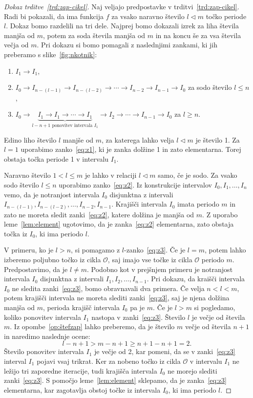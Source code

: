 \documentclass[mat2]{fmfdelo}
\begin{document}
\begin{proof}[Dokaz trditve~\ref{trd:zap-cikel}]
Naj veljajo predpostavke v trditvi~\ref{trd:zap-cikel}. Radi bi pokazali, da ima funkcija $f$ za vsako naravno število $l\triangleleft m$ točko periode $l$. Dokaz bomo razdelili na tri dele. Najprej bomo dokazali izrek za liha števila manjša od $m$, potem za soda števila manjša od $m$ in na koncu še za vsa števila večja od $m$.
Pri dokazu si bomo pomagali z naslednjimi zankami, ki jih preberamo s slike~\ref{fig:nkotnik}:
\begin{enumerate}[label={(Z\arabic*)}]
\item $I_1 \to I_1$,\label{eq:z1}
\item$I_0\to I_{n-(l-1)} \to I_{n-(l-2)} \to \cdots \to I_{n-2} \to I_{n-1} \to I_0$ za sodo število $l \leq n$,\label{eq:z2}
\item $I_0\to\underbrace{I_1 \to I_1 \to \cdots  \to I_1}_{l - n +1 \text{ ponovitev intervala } I_1} \to I_2 \to \cdots \to I_{n-1} \to I_0 $ za $l \geq n$.\label{eq:z3}
\end{enumerate}
Edino liho število $l$ manjše od $m$, za katerega lahko velja $l\triangleleft m$ je število 1. Za $l=1$ uporabimo zanko~\ref{eq:z1}, ki je zanka dolžine 1 in zato elementarna. Torej obstaja točka periode 1 v intervalu $I_1$.

Naravno število  $1<l \leq m$ je lahko v relaciji $l \triangleleft m$ samo, če je sodo. Za vsako sodo število $l \leq n$ uporabimo zanko~\ref{eq:z2}.
Iz konstrukcije intervalov $I_0, I_1, \dots, I_n$ vemo, da je notranjost intervala $I_0$ disjunktna z intervali $I_{n-(l-1)}, I_{n-(l-2)}, \dots, I_{n-2}, I_{n-1}$. Krajišči intervala $I_0$ imata periodo $m$ in zato ne moreta sledit zanki~\ref{eq:z2}, katere dolžina je manjša od $m$. Z uporabo leme~\ref{lem:element} ugotovimo, da je zanka~\ref{eq:z2} elementarna, zato obstaja točka iz $I_0$, ki ima periodo $l$.

V primeru, ko je $l >n$, si pomagamo z $l$-zanko~\ref{eq:z3}.
Če je $l=m$, potem lahko izberemo poljubno točko iz cikla $\mathcal{O}$, saj imajo vse točke iz cikla $\mathcal{O}$ periodo $m$. Predpostavimo, da je $l \neq m$. Podobno kot v prejšnjem primeru je notranjost intervala $I_0$ disjunktna z intervali $I_1, I_2, \dots, I_{n-1}$. Pri dokazu, da kraišči intervala $I_0$ ne sledita zanki~\ref{eq:z3}, bomo obravnavali dva primera. Če velja $n<l<m$, potem krajišči intervala ne moreta slediti zanki~\ref{eq:z3}, saj je njena dolžina manjša od $m$, perioda krajišč intervala $I_0$ pa je $m$. Če je $l >m$ si pogledamo, koliko ponovitev intervala $I_1$ nastopa v zanki~\ref{eq:z3}. Število $l$ je večje od števila $m$. Iz opombe~\ref{op:štefzap} lahko preberemo, da je število $m$ večje od števila $n+1$ in naredimo naslednje ocene:
$$l-n+1>m-n+1 \geq n+1-n+1 = 2.$$
Število ponovitev intervala $I_1$ je večje od 2, kar pomeni, da se v zanki~\ref{eq:z3} interval $I_1$ pojavi vsaj trikrat. Ker za nobeno točko iz cikla $\mathcal{O}$ v intervalu $I_1$ ne ležijo tri zaporedne iteracije, tudi krajišča intervala $I_0$ ne morejo slediti zanki~\ref{eq:z3}. S pomočjo leme~\ref{lem:element} sklepamo, da je zanka~\ref{eq:z3} elementarna, kar zagotavlja obstoj točke iz intervala $I_0$, ki ima periodo $l$.
\end{proof}
\end{document}
